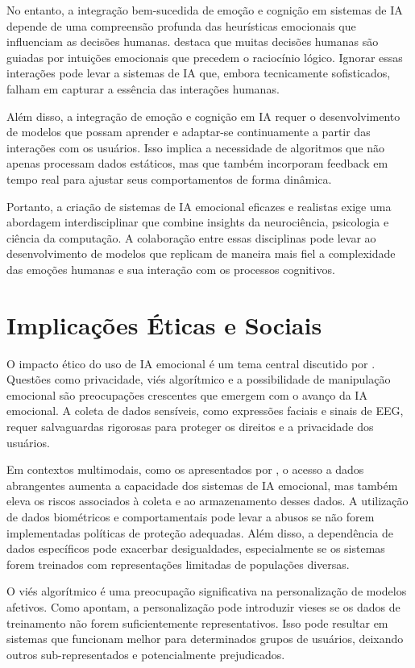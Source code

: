 \documentclass[a4paper,12pt]{report}
\begin{document}
	No entanto, a integração bem-sucedida de emoção e cognição em sistemas de IA depende de uma compreensão profunda das heurísticas emocionais que influenciam as decisões humanas. \textcite{haidt2001} destaca que muitas decisões humanas são guiadas por intuições emocionais que precedem o raciocínio lógico. Ignorar essas interações pode levar a sistemas de IA que, embora tecnicamente sofisticados, falham em capturar a essência das interações humanas.
	
	Além disso, a integração de emoção e cognição em IA requer o desenvolvimento de modelos que possam aprender e adaptar-se continuamente a partir das interações com os usuários. Isso implica a necessidade de algoritmos que não apenas processam dados estáticos, mas que também incorporam feedback em tempo real para ajustar seus comportamentos de forma dinâmica.
	
	Portanto, a criação de sistemas de IA emocional eficazes e realistas exige uma abordagem interdisciplinar que combine insights da neurociência, psicologia e ciência da computação. A colaboração entre essas disciplinas pode levar ao desenvolvimento de modelos que replicam de maneira mais fiel a complexidade das emoções humanas e sua interação com os processos cognitivos.
	
	
	\section{Implicações Éticas e Sociais}
	
	O impacto ético do uso de IA emocional é um tema central discutido por \textcite{mueller2020}. Questões como privacidade, viés algorítmico e a possibilidade de manipulação emocional são preocupações crescentes que emergem com o avanço da IA emocional. A coleta de dados sensíveis, como expressões faciais e sinais de EEG, requer salvaguardas rigorosas para proteger os direitos e a privacidade dos usuários.
	
	Em contextos multimodais, como os apresentados por \textcite{lee2024}, o acesso a dados abrangentes aumenta a capacidade dos sistemas de IA emocional, mas também eleva os riscos associados à coleta e ao armazenamento desses dados. A utilização de dados biométricos e comportamentais pode levar a abusos se não forem implementadas políticas de proteção adequadas. Além disso, a dependência de dados específicos pode exacerbar desigualdades, especialmente se os sistemas forem treinados com representações limitadas de populações diversas.
	
	O viés algorítmico é uma preocupação significativa na personalização de modelos afetivos. Como \textcite{kargarandehkordi2024} apontam, a personalização pode introduzir vieses se os dados de treinamento não forem suficientemente representativos. Isso pode resultar em sistemas que funcionam melhor para determinados grupos de usuários, deixando outros sub-representados e potencialmente prejudicados.
	
\end{document}
